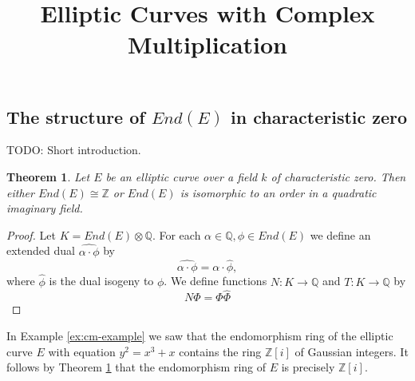 \documentclass{article}
\title{Elliptic Curves with Complex Multiplication}
\newtheorem{thm}{Theorem}[subsection]
\theoremstyle{definition}
\begin{document}
\subsection{The structure of $End(E)$ in characteristic zero}
\label{sec:struct-ende-char-zero}

TODO: Short introduction.

\begin{thm}
  \label{thm:structure-thm-for-End(E)}
  Let $E$ be an elliptic curve over a field $k$ of characteristic zero.  Then either
  $End(E) \cong \mathbb{Z}$ or $End(E)$ is isomorphic to an order in a quadratic
  imaginary field.
\end{thm}
\begin{proof}
  Let $K = End(E) \otimes \mathbb{Q}$.  For each $\alpha \in \mathbb{Q}, \phi \in
  End(E)$ we define an extended dual $\widehat{\alpha \cdot \phi}$ by
  \begin{equation*}
    \widehat{\alpha \cdot \phi} = \alpha \cdot \widehat{\phi},
  \end{equation*}
  where $\widehat{\phi}$ is the dual isogeny to $\phi$.  We define functions $N : K
  \rightarrow \mathbb{Q}$ and $T : K \rightarrow \mathbb{Q}$ by
  \begin{equation*}
    N \Phi = \Phi \widehat{\Phi}
  \end{equation*}
\end{proof}

In Example \ref{ex:cm-example} we saw that the endomorphism ring of the elliptic
curve $E$ with equation $y^{2} = x^{3} + x$ contains the ring $\mathbb{Z}[i]$ of
Gaussian integers.  It follows by Theorem \ref{thm:structure-thm-for-End(E)} that the
endomorphism ring of $E$ is precisely $\mathbb{Z}[i]$.


\end{document}
